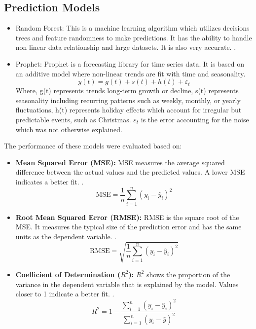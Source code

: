 \documentclass[conference]{IEEEtran}
\begin{document}
\subsection{Prediction Models}
\begin{itemize}
    \item Random Forest: This is a machine learning algorithm which utilizes decisions trees and feature randomness to make predictions. It has the ability to handle non linear data relationship and large datasets. It is also very accurate. \cite{kavlakoglu_random_forest}.
    \item Prophet: Prophet is a forecasting library for time series data. It is based on an additive model where non-linear trends are fit with time and seasonality. 
    \begin{equation}
        y(t) = g(t) + s(t)+ h(t) +\varepsilon_t
    \end{equation}
    Where, g(t) represents trends long-term growth or decline, s(t) represents seasonality including recurring patterns such as weekly, monthly, or yearly fluctuations, h(t) represents holiday effects which account for irregular but predictable events, such as Christmas. $\varepsilon_t$ is the error accounting for the noise which was not otherwise explained.    \cite{chugh_prophet,prophet_docs}
\end{itemize}
The performance of these models were evaluated based on:
\begin{itemize}
    \item \textbf{Mean Squared Error (MSE):}  
    MSE measures the average squared difference between the actual values and the predicted values. A lower MSE indicates a better fit. \cite{chugh_metrics}.
    \begin{equation}
    \mathrm{MSE} = \frac{1}{n}\sum_{i=1}^{n}(y_i-\hat{y}_i)^2
    \end{equation}
    \item \textbf{Root Mean Squared Error (RMSE):}  
    RMSE is the square root of the MSE. It measures the typical size of the prediction error and has the same units as the dependent variable. \cite{chugh_metrics}.
    \begin{equation}
    \mathrm{RMSE} = \sqrt{\frac{1}{n}\sum_{i=1}^{n}(y_i-\hat{y}_i)^2}
    \end{equation}
    \item \textbf{Coefficient of Determination (\(R^2\)):}  
    \(R^2\) shows the proportion of the variance in the dependent variable that is explained by the model. Values closer to 1 indicate a better fit.  \cite{chugh_metrics}.
    \begin{equation}
    R^2 = 1 - \frac{\sum_{i=1}^{n}(y_i-\hat{y}_i)^2}{\sum_{i=1}^{n}(y_i-\bar{y})^2}
    \end{equation}
\end{itemize}
\end{document}
